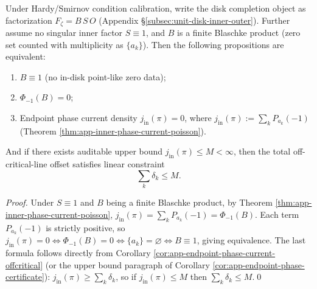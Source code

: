 \begin{corollary}\label{cor:xi-extreme-resonance-criterion}
Under Hardy/Smirnov condition calibration, write the disk completion object as factorization \(F_{\zeta}=B\,S\,O\) (Appendix \S\ref{subsec:unit-disk-inner-outer}).
Further assume no singular inner factor \(S\equiv 1\), and \(B\) is a finite Blaschke product (zero set counted with multiplicity as \(\{a_k\}\)).
Then the following propositions are equivalent:
\begin{enumerate}
  \item \(B\equiv 1\) (no in-disk point-like zero data);
  \item \(\Phi_{-1}(B)=0\);
  \item Endpoint phase current density \(j_{\mathrm{in}}(\pi)=0\), where \(j_{\mathrm{in}}(\pi):=\sum_k P_{a_k}(-1)\) (Theorem \ref{thm:app-inner-phase-current-poisson}).
\end{enumerate}
And if there exists auditable upper bound \(j_{\mathrm{in}}(\pi)\le M<\infty\), then the total off-critical-line offset satisfies linear constraint
\[
\sum_k\delta_k\le M.
\]
\end{corollary}

\begin{proof}
Under \(S\equiv 1\) and \(B\) being a finite Blaschke product, by Theorem \ref{thm:app-inner-phase-current-poisson},
\(
j_{\mathrm{in}}(\pi)=\sum_k P_{a_k}(-1)=\Phi_{-1}(B)
\).
Each term \(P_{a_k}(-1)\) is strictly positive, so
\(
j_{\mathrm{in}}(\pi)=0
\iff
\Phi_{-1}(B)=0
\iff
\{a_k\}=\varnothing
\iff
B\equiv 1
\), giving equivalence.
The last formula follows directly from Corollary \ref{cor:app-endpoint-phase-current-offcritical} (or the upper bound paragraph of Corollary \ref{cor:app-endpoint-phase-certificate}): \(j_{\mathrm{in}}(\pi)\ge \sum_k\delta_k\), so if \(j_{\mathrm{in}}(\pi)\le M\) then \(\sum_k\delta_k\le M\).\qed
\end{proof}


